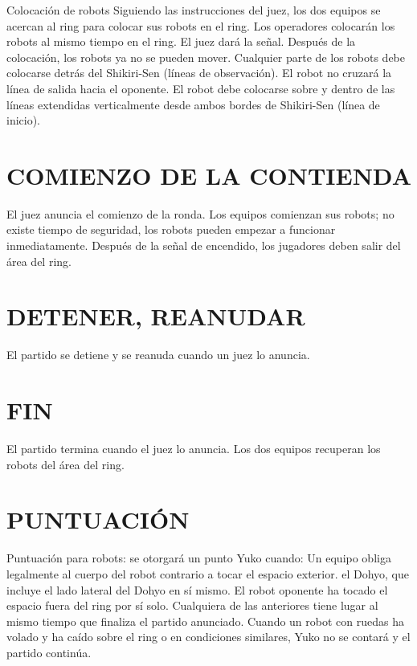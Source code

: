 \documentclass[
  letterpaper,
  DIV=11,
  numbers=noendperiod]{scrreprt}
\begin{document}
Colocación de robots Siguiendo las instrucciones del juez, los dos
equipos se acercan al ring para colocar sus robots en el ring. Los
operadores colocarán los robots al mismo tiempo en el ring. El juez dará
la señal. Después de la colocación, los robots ya no se pueden mover.
Cualquier parte de los robots debe colocarse detrás del Shikiri-Sen
(líneas de observación). El robot no cruzará la línea de salida hacia el
oponente. El robot debe colocarse sobre y dentro de las líneas
extendidas verticalmente desde ambos bordes de Shikiri-Sen (línea de
inicio).

\section{COMIENZO DE LA CONTIENDA}\label{comienzo-de-la-contienda}

El juez anuncia el comienzo de la ronda. Los equipos comienzan sus
robots; no existe tiempo de seguridad, los robots pueden empezar a
funcionar inmediatamente. Después de la señal de encendido, los
jugadores deben salir del área del ring.

\section{DETENER, REANUDAR}\label{detener-reanudar}

El partido se detiene y se reanuda cuando un juez lo anuncia.

\section{FIN}\label{fin}

El partido termina cuando el juez lo anuncia. Los dos equipos recuperan
los robots del área del ring.

\section{PUNTUACIÓN}\label{puntuaciuxf3n}

Puntuación para robots: se otorgará un punto Yuko cuando: Un equipo
obliga legalmente al cuerpo del robot contrario a tocar el espacio
exterior. el Dohyo, que incluye el lado lateral del Dohyo en sí mismo.
El robot oponente ha tocado el espacio fuera del ring por sí solo.
Cualquiera de las anteriores tiene lugar al mismo tiempo que finaliza el
partido anunciado. Cuando un robot con ruedas ha volado y ha caído sobre
el ring o en condiciones similares, Yuko no se contará y el partido
continúa.
\end{document}
